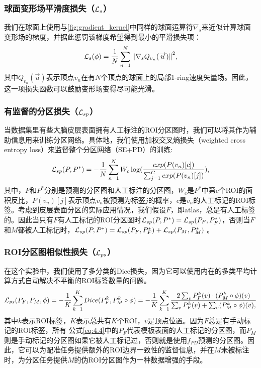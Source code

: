 \subsubsection{球面变形场平滑度损失（${\cal L}_s$）}
我们在球面上使用与\ref{fig:gradient_kernel}中同样的球面运算符$\nabla_s$来近似计算球面变形场的梯度，并据此惩罚该梯度希望得到最小的平滑损失项：
\begin{equation}\label{eq:4.2}
{\cal L}_{s}(\phi)=\frac{1}{N}\sum_{n=1}^{N} {\| \nabla_s Q_{v_n}(\overrightarrow{u}) \|}^2,
\end{equation}
其中$Q_{v_n}(\overrightarrow{u})$表示顶点$v_n$在有$N$个顶点的球面上的局部1-ring速度矢量场。因此，这一项损失函数可以鼓励变形场变得尽可能光滑。

\subsubsection{有监督的分区损失（${\cal L}_{sp}$）}
当数据集里有些大脑皮层表面拥有人工标注的ROI分区图时，我们可以将其作为辅助信息用来训练分区网络。具体地，我们使用加权交叉熵损失（weighted cross entropy loss）来监督整个分区网络（SE+PD）的训练:
\begin{equation}\label{eq:4.3}
{\cal L}_{sp}(P, P^*)=-\frac{1}{N}\sum_{n=1}^{N}W_c \log(\frac{exp(P(v_n)[c])}{\sum_{j=1}^{C}exp(P(v_n)[j])}),
\end{equation}
其中，$P$和$P^*$分别是预测的分区图和人工标注的分区图，$W_c$是$P^*$中第$c$个ROI的面积反比，$P(v_n )[j]$表示顶点$v_n$被预测为标签$j$的概率，$c$是$v_n$的人工标记的ROI标签。考虑到皮层表面分区的实际应用情况，我们假设$F$，即atlas，总是有人工标签的。因此当只有$F$有人工标记的ROI分区图时${\cal L}_{sp}(P,P^*)={\cal L}_{sp}(P_F,P_F^* )$，否则当$F$和$M$都被人工标记时，${\cal L}_{sp}(P,P^* )={\cal L}_{sp} (P_F,P_F^*)+{\cal L}_{sp}(P_M,P_M^*)$ 。

\subsubsection{ROI分区图相似性损失（${\cal L}_{ps}$）}
在这个实验中，我们使用了多分类的Dice损失，因为它可以使用内在的多类平均计算方式自动解决不平衡的ROI标签数量的问题\cite{xu2019deepatlas}。
\begin{equation}\label{eq:4.4}
{\cal L}_{ps}(P_F,P_M,\phi)=-\frac{1}{K}\sum_{k=1}^{K}Dice(P_F^k,P_M^k\circ \phi)=-\frac{1}{K}\sum_{k=1}^{K}\frac{2\sum_{v}P_F^k(v)\cdot (P_M^k\circ \phi)(v)}{\sum_{v}P_F^k(v)+\sum_{v}(P_M^k\circ \phi)(v),}
\end{equation}
其中$k$表示ROI标签，$K$表示总共有$K$个ROI，$v$是顶点位置。因为$F$总是有手动标记的ROI标签，所有 公式\ref{eq:4.4}中的$P_F$代表模板表面的人工标记的分区图，而$P_M$则是手动标记的分区图如果它被人工标记过，否则就是使用$f_{PD}$预测的分区图。因此，它可以为配准任务提供额外的ROI边界一致性的监督信息，并在$M$未被标注时，为分区任务提供$M$的伪ROI分区图作为一种数据增强的手段。

